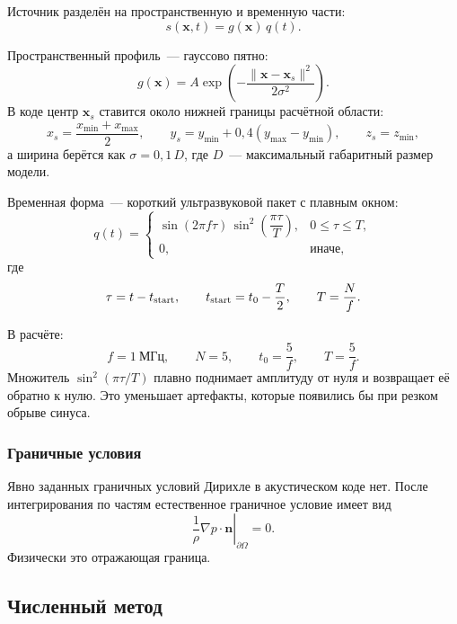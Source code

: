 Источник разделён на пространственную и временную части:
\begin{equation}
  s(\mathbf{x},t)=g(\mathbf{x})\,q(t).
\end{equation}

Пространственный профиль~--- гауссово пятно:
\begin{equation}
  g(\mathbf{x}) =
  A \exp\left(
    -\frac{\|\mathbf{x}-\mathbf{x}_s\|^2}{2\sigma^2}
  \right).
\end{equation}
В коде центр $\mathbf{x}_s$ ставится около нижней границы расчётной
области:
\begin{equation}
  x_s=\frac{x_{\min}+x_{\max}}{2}, \qquad
  y_s=y_{\min}+0{,}4(y_{\max}-y_{\min}), \qquad
  z_s=z_{\min},
\end{equation}
а ширина берётся как $\sigma=0{,}1\,D$, где $D$~--- максимальный
габаритный размер модели.

Временная форма~--- короткий ультразвуковой пакет с плавным окном:
\begin{equation}\label{eq:burst}
q(t)=
\begin{cases}
  \sin(2\pi f\tau)\,
  \sin^2\left(\dfrac{\pi\tau}{T}\right),
  & 0 \le \tau \le T,\\[8pt]
  0, & \text{иначе},
\end{cases}
\end{equation}
где
\[
  \tau=t-t_{\rm start}, \qquad
  t_{\rm start}=t_0-\frac{T}{2}, \qquad
  T=\frac{N}{f}.
\]

В расчёте:
\[
  f = 1~\text{МГц}, \qquad N=5, \qquad
  t_0=\frac{5}{f}, \qquad T=\frac{5}{f}.
\]
Множитель $\sin^2(\pi\tau/T)$ плавно поднимает амплитуду от нуля и
возвращает её обратно к нулю. Это уменьшает артефакты, которые появились
бы при резком обрыве синуса.

\subsubsection{Граничные условия}

Явно заданных граничных условий Дирихле в акустическом коде нет.
После интегрирования по частям естественное граничное условие имеет вид
\begin{equation}
  \left.
  \frac{1}{\rho}\nabla p\cdot\mathbf{n}
  \right|_{\partial\Omega}=0.
\end{equation}
Физически это отражающая граница.

\subsection{Численный метод}

